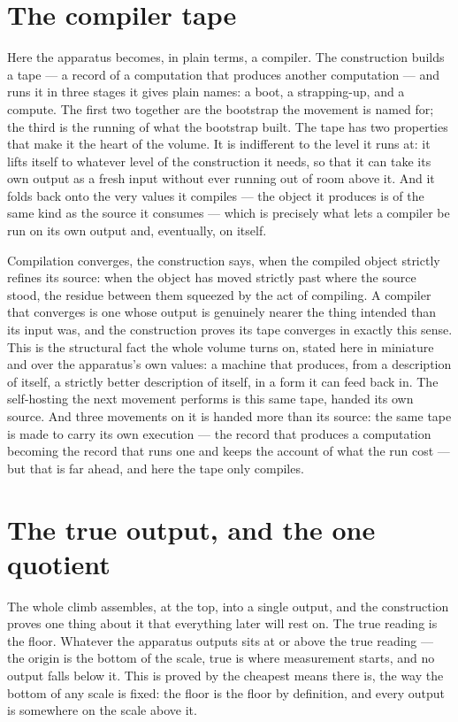 \section{The compiler tape}
\label{se:the-compiler-tape}

Here the apparatus becomes, in plain terms, a compiler. The construction builds a tape --- a record of a
computation that produces another computation --- and runs it in three stages it gives plain names: a
boot, a strapping-up, and a compute. The first two together are the bootstrap the movement is named for;
the third is the running of what the bootstrap built. The tape has two properties that make it the heart of
the volume. It is indifferent to the level it runs at: it lifts itself to whatever level of the
construction it needs, so that it can take its own output as a fresh input without ever running out of room
above it. And it folds back onto the very values it compiles --- the object it produces is of the same kind
as the source it consumes --- which is precisely what lets a compiler be run on its own output and,
eventually, on itself.

Compilation converges, the construction says, when the compiled object strictly refines its source: when
the object has moved strictly past where the source stood, the residue between them squeezed by the act of
compiling. A compiler that converges is one whose output is genuinely nearer the thing intended than its
input was, and the construction proves its tape converges in exactly this sense. This is the structural
fact the whole volume turns on, stated here in miniature and over the apparatus's own values: a machine
that produces, from a description of itself, a strictly better description of itself, in a form it can feed
back in. The self-hosting the next movement performs is this same tape, handed its own source. And three
movements on it is handed more than its source: the same tape is made to carry its own execution --- the
record that produces a computation becoming the record that runs one and keeps the account of what the run
cost --- but that is far ahead, and here the tape only compiles.

\section{The true output, and the one quotient}
\label{se:true-output-one-quotient}

The whole climb assembles, at the top, into a single output, and the construction proves one thing about it
that everything later will rest on. The true reading is the floor. Whatever the apparatus outputs sits at
or above the true reading --- the origin is the bottom of the scale, true is where measurement starts, and
no output falls below it. This is proved by the cheapest means there is, the way the bottom of any scale is
fixed: the floor is the floor by definition, and every output is somewhere on the scale above it.

